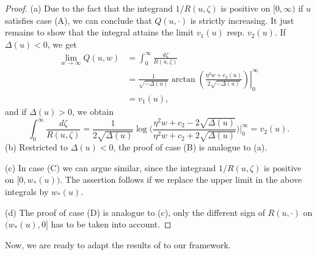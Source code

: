 \documentclass[12pt,a4paper]{amsart}
\numberwithin{equation}{section}
\numberwithin{equation}{section}
\theoremstyle{nonumberplain}
\begin{document}
\begin{proof}
	(a) Due to the fact that the integrand $ 1/R(u,\zeta)$ is positive on $[0,\infty)$ if $u$ satisfies case (A), we can conclude that $ Q(u,\cdot)$ is strictly increasing. It just remains to show that the integral attains the limit $v_1(u)$ resp. $v_2(u)$. If $\Delta(u)<0$, we get
	\begin{align*}
		\lim_{w \rightarrow \infty} Q(u,w) &= \int_0^{\infty}\frac{d\zeta}{R(u,\zeta)} \\&= \left. \frac{1}{\sqrt{-\Delta(u)}}  \arctan \left( \frac{\eta^2 w + c_2(u)}{2\sqrt{-\Delta(u)}} \right) \right|_0^{\infty} \\&= v_1(u),
	\end{align*}
	and if $\Delta(u)>0$, we obtain
	\begin{equation*}
		\int_0^{\infty}\frac{d\zeta}{R(u,\zeta)} = \frac{1}{2 \sqrt{\Delta(u)}} \log \bigg( \frac{\eta^2 w + c_2 - 2 \sqrt{\Delta(u)}}{\eta^2 w + c_2 + 2 \sqrt{\Delta(u)}} \bigg) \Bigg|_0^{\infty} = v_2(u).
	\end{equation*}
	(b) Restricted to $\Delta(u)<0$, the proof of case (B) is analogue to (a).
	
	(c) In case (C) we can argue similar, since the integrand $ 1/R(u,\zeta)$ is positive on $[0,w_*(u))$. The assertion follows if we replace the upper limit in the above integrals by $w_*(u)$.
	
	(d) The proof of case (D) is analogue to (c), only the different sign of $R(u,\cdot)$ on $(w_*(u),0]$ has to be taken into account. 
\end{proof}
Now, we are ready to adapt the results of \cite[Appendix~A]{gatheral2018affine} to our framework.
\end{document}
